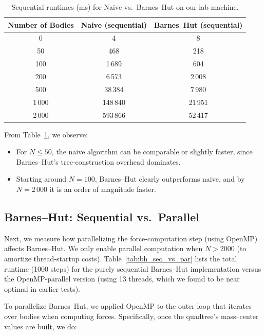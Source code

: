 \documentclass{article}
\begin{document}
\begin{table}[H]
    \centering
    \begin{tabular}{|c|c|c|}
    \hline
    \textbf{Number of Bodies} & \textbf{Naive (sequential)} & \textbf{Barnes–Hut (sequential)} \\
    \hline
    0     &     4    &      8    \\ 
    50    &   468    &    218    \\ 
    100   &  1\,689  &    604    \\ 
    200   &  6\,573  &  2\,008   \\ 
    500   & 38\,384  &  7\,980   \\ 
    1\,000 & 148\,840 & 21\,951   \\ 
    2\,000 & 593\,866 & 52\,417   \\ 
    \hline
    \end{tabular}
    \caption{Sequential runtimes (ms) for Naive vs.\ Barnes–Hut on our lab machine.}
    \label{tab:naive_vs_bh}
\end{table}

\noindent
From Table~\ref{tab:naive_vs_bh}, we observe:
\begin{itemize}
  \item For $N \le 50$, the naive algorithm can be comparable or slightly faster, since Barnes–Hut’s tree‐construction overhead dominates.
  \item Starting around $N = 100$, Barnes–Hut clearly outperforms naive, and by $N=2\,000$ it is an order of magnitude faster.
\end{itemize}

\subsection{Barnes–Hut: Sequential vs.\ Parallel}

Next, we measure how parallelizing the force‐computation step (using OpenMP) affects Barnes–Hut.  We only enable parallel computation when $N>2000$ (to amortize thread‐startup costs).  Table~\ref{tab:bh_seq_vs_par} lists the total runtime (1000 steps) for the purely sequential Barnes–Hut implementation versus the OpenMP‐parallel version (using 13 threads, which we found to be near optimal in earlier tests).

\noindent
To parallelize Barnes–Hut, we applied OpenMP to the outer loop that iterates over bodies when computing forces. Specifically, once the quadtree’s mass–center values are built, we do:
\end{document}
